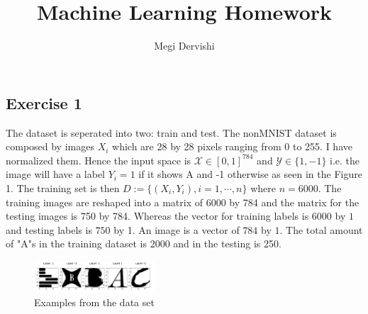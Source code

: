 \documentclass[10pt,a4paper]{article}
\author{Megi Dervishi}
\title{Machine Learning Homework}
\begin{document}
\maketitle
\subsection*{Exercise 1}
The dataset is seperated into two: train and test. The nonMNIST dataset is composed by images $X_i$ which are 28 by 28 pixels ranging from 0 to 255. I have normalized them. Hence the input space is $\mathcal{X} \in [0,1]^{784}$ and $\mathcal{Y} \in \{1,-1\}$ i.e. the image will have a label  $Y_i = 1$ if it shows A and -1 otherwise as seen in the Figure 1. The training set is then $D := \{(X_i, Y_i), i = 1, \cdots , n\}$ where $n = 6000$. The training images are reshaped into a matrix of 6000 by 784 and the matrix for the testing images is 750 by 784.  Whereas the vector for training labels is $6000$ by $1$ and testing labels is $750$ by 1. An image is a vector of $784$ by $1$.  The total amount of "A"s in the training dataset is 2000 and in the testing is 250. 
\begin{figure}[h!]
\centering
\includegraphics[width = 0.4\textwidth]{figures/img1}
\caption{Examples from the data set}
\end{figure}
\end{document}
